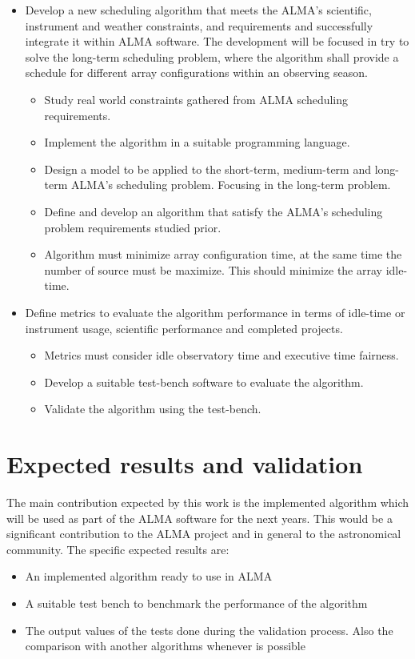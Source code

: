 \begin{itemize}
\item Develop a new scheduling algorithm that meets the ALMA’s scientific, instrument and
weather constraints, and requirements and successfully integrate it within ALMA software.
The development will be focused in try to solve the long-term scheduling problem, where
the algorithm shall provide a schedule for different array configurations within an
observing season.
\begin{itemize}
\item Study real world constraints gathered from ALMA scheduling requirements.
\item Implement the algorithm in a suitable programming language.
\item Design a model to be applied to the short-term, medium-term and long-term ALMA’s
scheduling problem. Focusing in the long-term problem.
\item Define and develop an algorithm that satisfy the ALMA’s scheduling problem requirements
studied prior.
\item Algorithm must minimize array configuration time, at the same time the number of source
must be maximize. This should minimize the array idle-time.
\end{itemize}
\item Define metrics to evaluate the algorithm performance in terms of idle-time or instrument
usage, scientific performance and completed projects.
\begin{itemize}
\item Metrics must consider idle observatory time and executive time fairness.
\item Develop a suitable test-bench software to evaluate the algorithm.
\item Validate the algorithm using the test-bench.
\end{itemize}
\end{itemize}

\section{Expected results and validation}
The main contribution expected by this work is the implemented algorithm which will be used as
part of the ALMA software for the next years. This would be a significant contribution to the
ALMA project and in general to the astronomical community.
The specific expected results are:
\begin{itemize}
\item An implemented algorithm ready to use in ALMA
\item A suitable test bench to benchmark the performance of the algorithm
\item The output values of the tests done during the validation process. Also the comparison with
another algorithms whenever is possible
\end{itemize}

